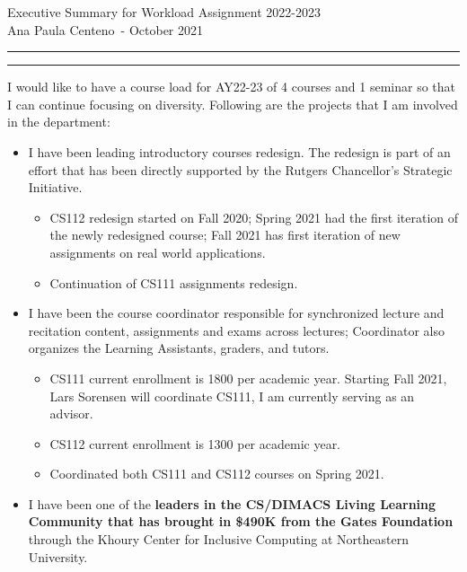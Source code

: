 \documentclass[11pt]{article}
\newcommand{\soptitle}{Executive Summary for Workload Assignment 2022-2023}
\newcommand{\yourname}{Ana Paula Centeno}
\begin{document}
\begin{center}\LARGE\soptitle\\
\large \yourname\ - October 2021
\end{center}

\hrule
\vspace{1pt}
\hrule height 1pt

\bigskip
\bigskip

I would like to have a course load for AY22-23 of 4 courses and 1 seminar so that I can continue focusing on diversity. Following are the projects that I am involved in the department:

\bigskip

\begin{itemize}

\item I have been leading introductory courses redesign. The redesign is part of an effort that has been directly supported by the Rutgers Chancellor's Strategic Initiative.

\begin{itemize}
  \item CS112 redesign started on Fall 2020; Spring 2021 had the
    first iteration of the newly redesigned course; Fall 2021 has first iteration of
    new assignments on real world applications.
   \item Continuation of CS111 assignments redesign.
\end{itemize}

  \item I have been the course coordinator responsible for synchronized lecture and recitation content, assignments and exams across lectures; Coordinator also organizes the Learning Assistants, graders, and tutors.
    \begin{itemize}
    	\item CS111 current enrollment is 1800 per academic year. Starting Fall 2021, Lars Sorensen
    will coordinate CS111, I am currently serving as an advisor.
    	\item CS112 current enrollment is 1300 per academic year.
      	\item Coordinated both CS111 and CS112 courses on Spring 2021.
      \end{itemize}
  
  \item I have been one of the {\bf leaders in the CS/DIMACS Living
    Learning Community that has brought in \$490K from the Gates
    Foundation} through the Khoury Center for Inclusive Computing at
    Northeastern University.


\end{itemize}
\end{document}
